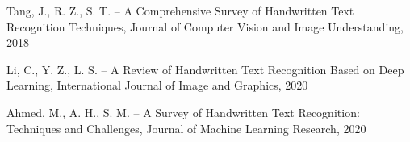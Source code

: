 \documentclass{article}
\begin{document}
\begin{thebibliography}{00}
Tang, J., R. Z., S. T. -- A Comprehensive Survey of Handwritten Text Recognition Techniques, Journal of Computer Vision and Image Understanding, 2018
	
Li, C., Y. Z., L. S. -- A Review of Handwritten Text Recognition Based on Deep Learning, International Journal of Image and Graphics, 2020
	
Ahmed, M., A. H., S. M. -- A Survey of Handwritten Text Recognition: Techniques and Challenges, Journal of Machine Learning Research, 2020
\end{thebibliography}

\end{document}
